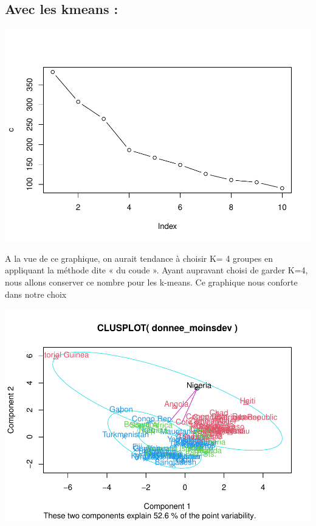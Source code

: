 \documentclass[
]{article}
\newenvironment{Shaded}{}{}
\newcommand{\AttributeTok}[1]{#1}
\newcommand{\DecValTok}[1]{#1}
\newcommand{\FunctionTok}[1]{#1}
\newcommand{\NormalTok}[1]{#1}
\newcommand{\OtherTok}[1]{\textcolor[rgb]{1.00,0.25,0.00}{#1}}
\newcommand{\SpecialCharTok}[1]{\textcolor[rgb]{0.00,0.50,0.50}{#1}}
\begin{document}
\hypertarget{avec-les-kmeans}{%
\subsection{Avec les kmeans :}\label{avec-les-kmeans}}

\includegraphics{Projet_files/figure-latex/unnamed-chunk-34-1.pdf}

A la vue de ce graphique, on aurait tendance à choisir K= 4 groupes en
appliquant la méthode dite « du coude ». Ayant aupravant choisi de
garder K=4, nous allons conserver ce nombre pour les k-means. Ce
graphique nous conforte dans notre choix

\begin{Shaded}
\end{Shaded}

\includegraphics{Projet_files/figure-latex/unnamed-chunk-35-1.pdf}
\end{document}
